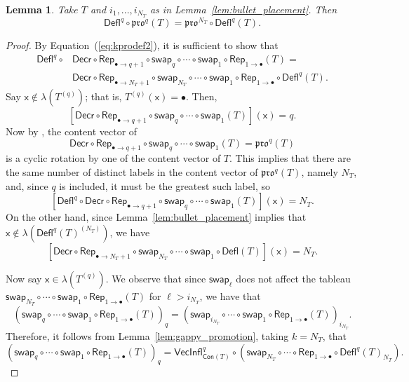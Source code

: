 \documentclass[12pt]{amsart}
\newcommand{\x}{\ensuremath{\mathsf{x}}}
\newtheorem{lemma}[theorem]{Lemma}
\theoremstyle{definition}
\theoremstyle{remark}
\numberwithin{equation}{section}
\newcommand{\pro}{\mathfrak{pro}}
\newcommand{\swap}{\ensuremath{\mathsf{swap}}}
\newcommand{\decr}{\ensuremath{\mathsf{Decr}}}
\newcommand{\rep}{\ensuremath{\mathsf{Rep}}}
\newcommand{\deflate}{\ensuremath{\mathsf{Defl}}}
\newcommand{\inflate}{\ensuremath{\mathsf{VecInfl}}}
\newcommand{\content}{\ensuremath{\mathsf{Con}}}
\begin{document}
\begin{lemma}\label{lem:deflation_commutation}
Take $T$ and $i_1,...,i_{N_T}$ as in Lemma~\ref{lem:bullet_placement}. Then
\begin{equation}\label{eq:deflation_commutation}
\deflate^q \circ \pro^q(T) = \pro^{N_T} \circ \deflate^q(T).
\end{equation}

\end{lemma}
\begin{proof}
By Equation~(\ref{eq:kprodef2}), it is sufficient to show that
\begin{align*}
\deflate^q \circ &\decr \circ \rep_{\bullet \rightarrow q+1} \circ \swap_q \circ \cdots \circ \swap_1\circ \rep_{1 \rightarrow \bullet} (T) = \\
 & \decr \circ \rep_{\bullet \rightarrow N_T+1} \circ \swap_{N_T} \circ \cdots \circ \swap_1 \circ \rep_{1 \rightarrow \bullet} \circ \deflate^q (T). 
\end{align*}
Say $\x \not \in \lambda(T^{(q)})$; that is,  $T^{(q)}(\x) = \bullet$.  Then,
\[
[\decr \circ \rep_{\bullet \rightarrow q+1} \circ \swap_q \circ \cdots \circ \swap_1 (T)](\x) = q.
\]
Now by \cite[Lemma~2.1]{DPS}, the content vector of  
\[
\decr \circ \rep_{\bullet \rightarrow q+1} \circ \swap_q \circ \cdots \circ \swap_1 (T) = \pro^q(T)
\]
 is a cyclic rotation by one of the content vector of $T$. This implies that there are the same number of distinct labels in the content vector of $\pro^q(T)$, namely $N_T$, and, since $q$ is included, it must be the greatest such label, so 
 \[
 [\deflate^q \circ \decr \circ \rep_{\bullet \rightarrow q+1} \circ \swap_q \circ \cdots \circ \swap_1 (T)](\x) = N_T.
 \]
  On the other hand, since Lemma~\ref{lem:bullet_placement} implies that $\x \not \in \lambda(\deflate^q(T)^{(N_T)})$, we have
  \[
  [\decr \circ \rep_{\bullet \rightarrow N_T + 1} \circ \swap_{N_T} \circ \cdots \circ \swap_1 \circ \deflate(T)](\x) = N_T.
  \] 

Now say $\x \in \lambda(T^{(q)})$. We observe that since $\swap_\ell$ does not affect the tableau $\swap_{N_T} \circ \cdots \circ \swap_1 \circ \rep_{1 \rightarrow \bullet} (T)$ for $\ell > i_{N_T}$, we have that
\[ (\swap_q \circ \cdots \circ \swap_1 \circ \rep_{1 \rightarrow \bullet}( T ))_q = (\swap_{i_{N_T}} \circ \cdots \circ \swap_1 \circ \rep_{1 \rightarrow \bullet}( T ))_{i_{N_T}}.  \]
Therefore, it follows from Lemma~\ref{lem:gappy_promotion}, taking $k = N_T$, that 
\[ (\swap_q \circ \cdots \circ \swap_1 \circ \rep_{1 \rightarrow \bullet}( T ))_q = \inflate^q_{\content(T)} \circ (\swap_{N_T} \circ \cdots \circ  \rep_{1 \rightarrow \bullet} \circ \deflate^q(T)_{N_T}). \]


\end{proof}
\end{document}
